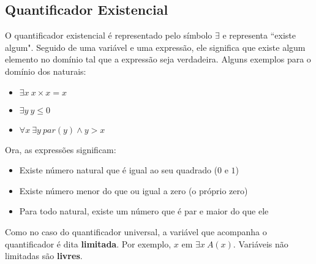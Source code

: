     \subsection{Quantificador Existencial}

        O quantificador existencial é representado pelo símbolo $\exists$ e representa ``existe algum".
        Seguido de uma variável e uma expressão, ele significa que existe algum elemento no domínio tal que a expressão seja verdadeira.
        Alguns exemplos para o domínio dos naturais:

        \begin{itemize}
            \item $\exists x \ x \times x = x$
            \item $\exists y \ y \le 0$
            \item $\forall x \ \exists y \ par(y) \land y > x$
        \end{itemize}

        Ora, as expressões significam:

        \begin{itemize}
            \item Existe número natural que é igual ao seu quadrado ($0$ e $1$)
            \item Existe número menor do que ou igual a zero (o próprio zero)
            \item Para todo natural, existe um número que é par e maior do que ele
        \end{itemize}

        Como no caso do quantificador universal, a variável que acompanha o quantificador é dita \textbf{limitada}. Por exemplo, $x$ em $\exists x \ A(x)$.
        Variáveis não limitadas são \textbf{livres}.